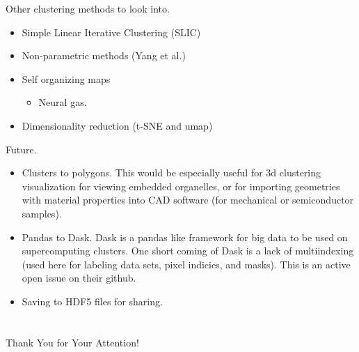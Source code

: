 \documentclass[
]{beamer}
\begin{document}
\begin{frame}{Other clustering methods to look into.}
\begin{itemize}
    \item Simple Linear Iterative Clustering (SLIC)
    \item Non-parametric methods (Yang et al.)
    \item Self organizing maps
    \begin{itemize}
        \item Neural gas.
    \end{itemize}
    \item Dimensionality reduction (t-SNE and umap)
\end{itemize}
\end{frame}

\begin{frame}{Future.}
\begin{itemize}
    \item Clusters to polygons. This would be especially useful for 3d clustering visualization for viewing embedded organelles, or for importing geometries with material properties into CAD software (for mechanical or semiconductor samples).
    \item Pandas to Dask. Dask is a pandas like framework for big data to be used on supercomputing clusters. One short coming of Dask is a lack of multiindexing (used here for labeling data sets, pixel indicies, and masks). This is an active open issue on their github.
    \item Saving to HDF5 files for sharing.
\end{itemize}
\end{frame}


\section{\bibname}
\begin{frame}[t, allowframebreaks]{\bibname}
\printbibliography[heading=none]
\end{frame}

\begin{frame}[plain]
\vfill
\centerline{Thank You for Your Attention!}
\vfill\vfill
\end{frame}
\end{document}

